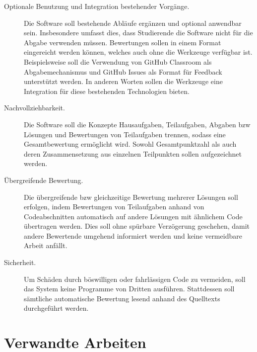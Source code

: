 \begin{description}
    \item[Optionale Benutzung und Integration bestehender Vorgänge.]
    Die Software soll bestehende Abläufe ergänzen und optional anwendbar sein.
    Insbesondere umfasst dies, dass Studierende die Software nicht für die Abgabe verwenden müssen.
    Bewertungen sollen in einem Format eingereicht werden können, welches auch ohne die Werkzeuge verfügbar ist.
    Beispielsweise soll die Verwendung von GitHub Classroom als Abgabemechanismus und GitHub Issues als Format für Feedback unterstützt werden.
    In anderen Worten sollen die Werkzeuge eine Integration für diese bestehenden Technologien bieten.
    \item[Nachvollziehbarkeit.]
    Die Software soll die Konzepte Hausaufgaben, Teilaufgaben, Abgaben \ac{bzw} Lösungen und Bewertungen von Teilaufgaben trennen, sodass eine Gesamtbewertung ermöglicht wird.
    Sowohl Gesamtpunktzahl als auch deren Zusammensetzung aus einzelnen Teilpunkten sollen aufgezeichnet werden.
    \item[Übergreifende Bewertung.]
    Die übergreifende \ac{bzw} gleichzeitige Bewertung mehrerer Lösungen soll erfolgen, indem Bewertungen von Teilaufgaben anhand von Codeabschnitten automatisch auf andere Lösungen mit ähnlichem Code übertragen werden.
    Dies soll ohne spürbare Verzögerung geschehen, damit andere Bewertende umgehend informiert werden und keine vermeidbare Arbeit anfällt.
    \item[Sicherheit.]
    Um Schäden durch böswilligen oder fahrlässigen Code zu vermeiden, soll das System keine Programme von Dritten ausführen.
    Stattdessen soll sämtliche automatische Bewertung lesend anhand des Quelltexts durchgeführt werden.
\end{description}

\section{Verwandte Arbeiten}\label{sec:related-work}

